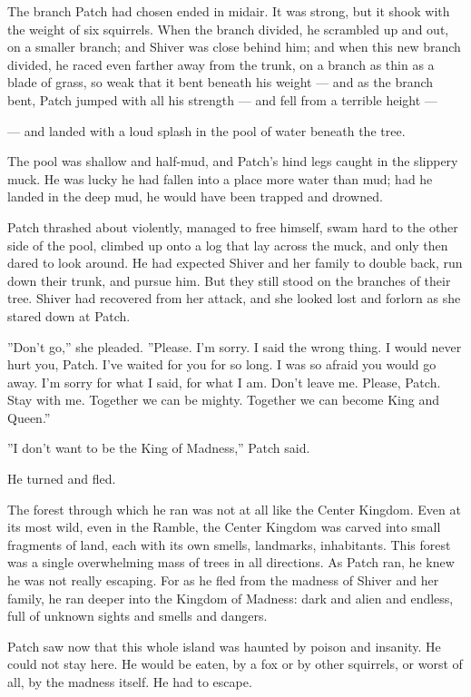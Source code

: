 \documentclass[12pt]{book}
\begin{document}
The branch Patch had chosen ended in midair. It was strong, but it shook with the weight of six squirrels. When the branch divided, he scrambled up and out, on a smaller branch; and Shiver was close behind him; and when this new branch divided, he raced even farther away from the trunk, on a branch as thin as a blade of grass, so weak that it bent beneath his weight ---
and as the branch bent, Patch jumped with all his strength ---
and fell from a terrible height ---

---
and landed with a loud splash in the pool of water beneath the tree.

The pool was shallow and half-mud, and Patch's hind legs caught in the slippery muck. He was lucky he had fallen into a place more water than mud; had he landed in the deep mud, he would have been trapped and drowned.

Patch thrashed about violently, managed to free himself, swam hard to the other side of the pool, climbed up onto a log that lay across the muck, and only then dared to look around. He had expected Shiver and her family to double back, run down their trunk, and pursue him. But they still stood on the branches of their tree. Shiver had recovered from her attack, and she looked lost and forlorn as she stared down at Patch.

''Don't go,'' she pleaded. ''Please. I'm sorry. I said the wrong thing. I would never hurt you, Patch. I've waited for you for so long. I was so afraid you would go away. I'm sorry for what I said, for what I am. Don't leave me. Please, Patch. Stay with me. Together we can be mighty. Together we can become King and Queen.''

''I don't want to be the King of Madness,'' Patch said.

He turned and fled.

The forest through which he ran was not at all like the Center Kingdom. Even at its most wild, even in the Ramble, the Center Kingdom was carved into small fragments of land, each with its own smells, landmarks, inhabitants. This forest was a single overwhelming mass of trees in all directions. As Patch ran, he knew he was not really escaping. For as he fled from the madness of Shiver and her family, he ran deeper into the Kingdom of Madness: dark and alien and endless, full of unknown sights and smells and dangers.

Patch saw now that this whole island was haunted by poison and insanity. He could not stay here. He would be eaten, by a fox or by other squirrels, or worst of all, by the madness itself. He had to escape.
\end{document}
